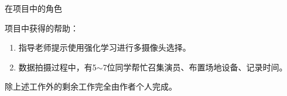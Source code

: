 \begin{frame}{在项目中的角色}
    \begin{block}

        项目中获得的帮助：

        \begin{enumerate}
            \item 指导老师提示使用强化学习进行多摄像头选择。\\[0.8em]
            \item 数据拍摄过程中，有5$\sim$7位同学帮忙召集演员、布置场地设备、记录时间。\\[0.8em]
        \end{enumerate}

        除上述工作外的剩余工作完全由作者个人完成。
    \end{block}
\end{frame}